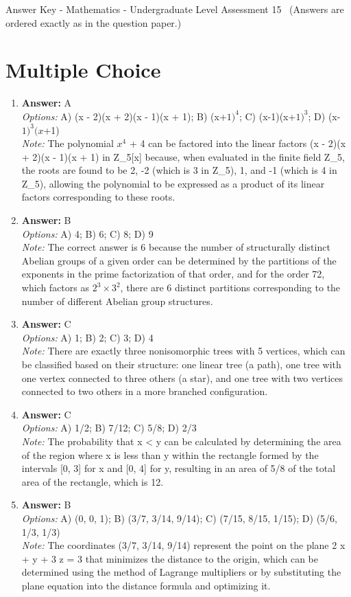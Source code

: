\documentclass[12pt]{article}
\begin{document}
\begin{center}
Answer Key - Mathematics - Undergraduate Level Assessment 15 \
\small (Answers are ordered exactly as in the question paper.)
\end{center}

\section*{Multiple Choice}
\begin{enumerate}[label=\arabic*.]
\item \textbf{Answer:} A
\\ \textit{Options:} A) (x - 2)(x + 2)(x - 1)(x + 1); B) (x+$1)^4$; C) (x-1)(x+$1)^3$; D) (x-$1)^3(x$+1)
\\ \textit{Note:} The polynomial $x^4$ + 4 can be factored into the linear factors (x - 2)(x + 2)(x - 1)(x + 1) in Z\_5[x] because, when evaluated in the finite field Z\_5, the roots are found to be 2, -2 (which is 3 in Z\_5), 1, and -1 (which is 4 in Z\_5), allowing the polynomial to be expressed as a product of its linear factors corresponding to these roots.
\item \textbf{Answer:} B
\\ \textit{Options:} A) 4; B) 6; C) 8; D) 9
\\ \textit{Note:} The correct answer is 6 because the number of structurally distinct Abelian groups of a given order can be determined by the partitions of the exponents in the prime factorization of that order, and for the order 72, which factors as \(2^3 \times 3^2\), there are 6 distinct partitions corresponding to the number of different Abelian group structures.
\item \textbf{Answer:} C
\\ \textit{Options:} A) 1; B) 2; C) 3; D) 4
\\ \textit{Note:} There are exactly three nonisomorphic trees with 5 vertices, which can be classified based on their structure: one linear tree (a path), one tree with one vertex connected to three others (a star), and one tree with two vertices connected to two others in a more branched configuration.
\item \textbf{Answer:} C
\\ \textit{Options:} A) 1/2; B) 7/12; C) 5/8; D) 2/3
\\ \textit{Note:} The probability that x \textless{} y can be calculated by determining the area of the region where x is less than y within the rectangle formed by the intervals [0, 3] for x and [0, 4] for y, resulting in an area of 5/8 of the total area of the rectangle, which is 12.
\item \textbf{Answer:} B
\\ \textit{Options:} A) (0, 0, 1); B) (3/7, 3/14, 9/14); C) (7/15, 8/15, 1/15); D) (5/6, 1/3, 1/3)
\\ \textit{Note:} The coordinates (3/7, 3/14, 9/14) represent the point on the plane 2 x + y + 3 z = 3 that minimizes the distance to the origin, which can be determined using the method of Lagrange multipliers or by substituting the plane equation into the distance formula and optimizing it.
\end{enumerate}
\end{document}
